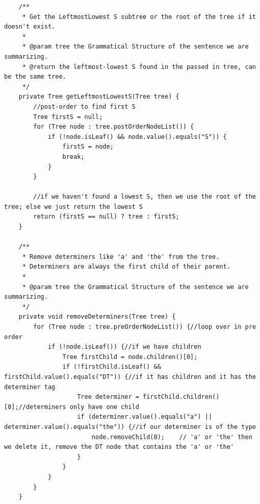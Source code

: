 \begin{lstlisting}
    /**
     * Get the LeftmostLowest S subtree or the root of the tree if it doesn't exist.
     *
     * @param tree the Grammatical Structure of the sentence we are summarizing.
     * @return the leftmost-lowest S found in the passed in tree, can be the same tree.
     */
    private Tree getLeftmostLowestS(Tree tree) {
        //post-order to find first S
        Tree firstS = null;
        for (Tree node : tree.postOrderNodeList()) {
            if (!node.isLeaf() && node.value().equals("S")) {
                firstS = node;
                break;
            }
        }

        //if we haven't found a lowest S, then we use the root of the tree; else we just return the lowest S
        return (firstS == null) ? tree : firstS;
    }

    /**
     * Remove determiners like 'a' and 'the' from the tree.
     * Determiners are always the first child of their parent.
     *
     * @param tree the Grammatical Structure of the sentence we are summarizing.
     */
    private void removeDeterminers(Tree tree) {
        for (Tree node : tree.preOrderNodeList()) {//loop over in pre order
            if (!node.isLeaf()) {//if we have children
                Tree firstChild = node.children()[0];
                if (!firstChild.isLeaf() && firstChild.value().equals("DT")) {//if it has children and it has the determiner tag
                    Tree determiner = firstChild.children()[0];//determiners only have one child
                    if (determiner.value().equals("a") || determiner.value().equals("the")) {//if our determiner is of the type
                        node.removeChild(0);    // 'a' or 'the' then we delete it, remove the DT node that contains the 'a' or 'the'
                    }
                }
            }
        }
    }


\end{lstlisting}
